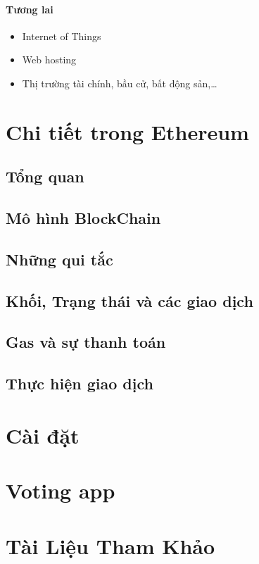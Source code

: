 \documentclass[12pt]{article}
\begin{document}
		\paragraph{Tương lai}
		\begin{itemize}
			\item Internet of Things
			
			\item Web hosting
			
			\item Thị trường tài chính, bầu cử, bất động sản,…
			
			
		\end{itemize}
	\newpage
	
	\section{Chi tiết trong Ethereum}
	
	\subsection{Tổng quan}
	
	\subsection{Mô hình BlockChain}
	
	\subsection{Những qui tắc}
	
	\subsection{Khối, Trạng thái và các giao dịch}
	
	\subsection{Gas và sự thanh toán}
	
	\subsection{Thực hiện giao dịch}
	
	\section{Cài đặt}
	
	
	\section{Voting app}
	
	\section{Tài Liệu Tham Khảo}
	
\end{document}
